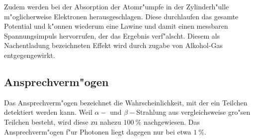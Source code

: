 		Zudem werden bei der Absorption der Atomr"umpfe in der Zylinderh"ulle m"oglicherweise Elektronen herausgeschlagen.
		Diese durchlaufen das gesamte Potential und k"onnen wiederum eine Lawine und damit einen messbaren Spannungsimpuls hervorrufen, der das Ergebnis verf"alscht.
		Diesem als Nachentladung bezeichneten Effekt wird durch zugabe von Alkohol-Gas entgegengewirkt.

	\subsection{Ansprechverm"ogen}
	\label{subsec:ansprechvermoegen}
		Das Ansprechverm"ogen bezeichnet die Wahrscheinlichkeit, mit der ein Teilchen detektiert werden kann.
		Weil $\alpha-$ und $\beta-$Strahlung aus vergleichsweise gro"sen Teilchen besteht, wird diese zu nahezu $\SI{100}{\percent}$ nachgewiesen.
		Das Ansprechverm"ogen f"ur Photonen liegt dagegen nur bei etwa $\SI{1}{\percent}$.